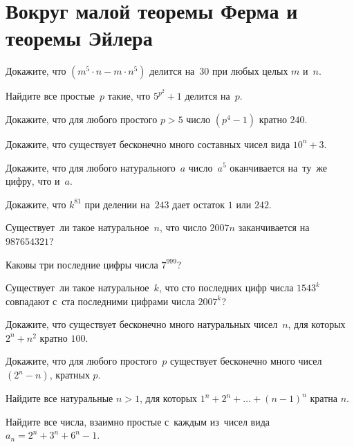 
\section*{Вокруг малой теоремы Ферма и теоремы Эйлера}


\begin{problems}

\item
Докажите, что $(m^5 \cdot n - m \cdot n^5)$ делится на~$30$ при любых целых $m$
и~$n$.

\item
Найдите все простые~$p$ такие, что $5^{p^2} + 1$ делится на~$p$.

\item
Докажите, что для любого простого $p > 5$ число $(p^4 - 1)$ кратно $240$.

\item
Докажите, что существует бесконечно много составных чисел вида $10^n + 3$.

\item
Докажите, что для любого натурального~$a$ число~$a^5$ оканчивается на~ту~же
цифру, что и~$a$.

\item
Докажите, что $k^{81}$ при делении на~$243$ дает остаток $1$ или $242$.

\item
Существует~ли такое натуральное~$n$, что число $2007 n$ заканчивается
на~$987654321$?

\item
Каковы три последние цифры числа $7^{999}$?

\item
Существует~ли такое натуральное~$k$, что сто последних цифр числа $1543^k$
совпадают с~ста последними цифрами числа $2007^k$?

\item
Докажите, что существует бесконечно много натуральных чисел~$n$, для которых
$2^n + n^2$ кратно $100$.

\item
Докажите, что для любого простого~$p$ существует бесконечно много чисел
$(2^n - n)$, кратных $p$.

\item
Найдите все натуральные $n > 1$, для которых $1^n + 2^n + \ldots + (n-1)^n$
кратна $n$.

\item
Найдите все числа, взаимно простые с~каждым из~чисел вида
$a_n = 2^n + 3^n + 6^n - 1$.

\end{problems}

